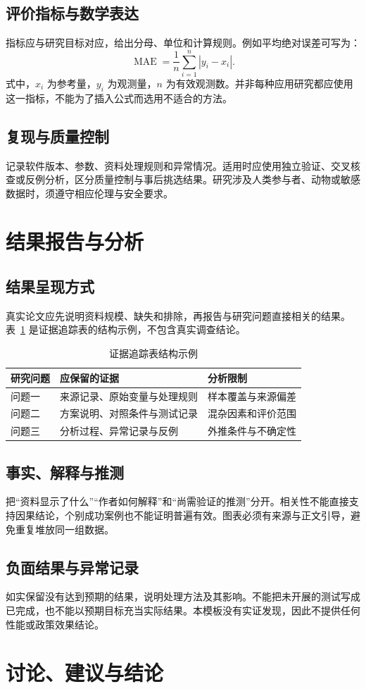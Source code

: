 \subsection{评价指标与数学表达}
指标应与研究目标对应，给出分母、单位和计算规则。例如平均绝对误差可写为：
\begin{equation}\label{eq:mae}\operatorname{MAE}=\frac{1}{n}\sum_{i=1}^{n}|y_i-x_i|.\end{equation}
式中，$x_i$ 为参考量，$y_i$ 为观测量，$n$ 为有效观测数。并非每种应用研究都应使用这一指标，不能为了插入公式而选用不适合的方法。
\subsection{复现与质量控制}
记录软件版本、参数、资料处理规则和异常情况。适用时应使用独立验证、交叉核查或反例分析，区分质量控制与事后挑选结果。研究涉及人类参与者、动物或敏感数据时，须遵守相应伦理与安全要求。
\clearpage\section{结果报告与分析}
\subsection{结果呈现方式}
真实论文应先说明资料规模、缺失和排除，再报告与研究问题直接相关的结果。表~\ref{tab:evidence} 是证据追踪表的结构示例，不包含真实调查结论。
\begin{table}[htbp]\centering\caption{证据追踪表结构示例}\label{tab:evidence}
\begin{tabularx}{\linewidth}{lXX}\toprule 研究问题 & 应保留的证据 & 分析限制\\\midrule
问题一 & 来源记录、原始变量与处理规则 & 样本覆盖与来源偏差\\
问题二 & 方案说明、对照条件与测试记录 & 混杂因素和评价范围\\
问题三 & 分析过程、异常记录与反例 & 外推条件与不确定性\\\bottomrule\end{tabularx}
\end{table}
\subsection{事实、解释与推测}
把“资料显示了什么”“作者如何解释”和“尚需验证的推测”分开。相关性不能直接支持因果结论，个别成功案例也不能证明普遍有效。图表必须有来源与正文引导，避免重复堆放同一组数据。
\subsection{负面结果与异常记录}
如实保留没有达到预期的结果，说明处理方法及其影响。不能把未开展的测试写成已完成，也不能以预期目标充当实际结果。本模板没有实证发现，因此不提供任何性能或政策效果结论。
\clearpage\section{讨论、建议与结论}
